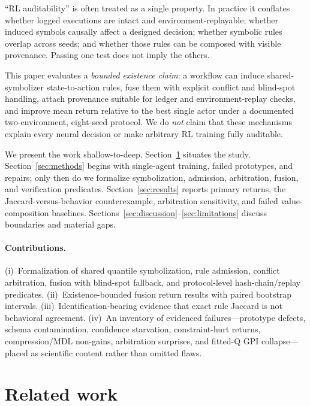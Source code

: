 \documentclass[11pt,a4paper]{article}
\begin{document}
``RL auditability'' is often treated as a single property.
In practice it conflates whether logged executions are intact and environment-replayable; whether induced symbols causally affect a designed decision; whether symbolic rules overlap across seeds; and whether those rules can be composed with visible provenance.
Passing one test does not imply the others.

This paper evaluates a \emph{bounded existence claim}: a workflow can induce shared-symbolizer state-to-action rules, fuse them with explicit conflict and blind-spot handling, attach provenance suitable for ledger and environment-replay checks, and improve mean return relative to the best single actor under a documented two-environment, eight-seed protocol.
We do \emph{not} claim that these mechanisms explain every neural decision or make arbitrary RL training fully auditable.

We present the work shallow-to-deep.
Section~\ref{sec:related} situates the study.
Section~\ref{sec:methods} begins with single-agent training, failed prototypes, and repairs; only then do we formalize symbolization, admission, arbitration, fusion, and verification predicates.
Section~\ref{sec:results} reports primary returns, the Jaccard-versus-behavior counterexample, arbitration sensitivity, and failed value-composition baselines.
Sections~\ref{sec:discussion}--\ref{sec:limitations} discuss boundaries and material gaps.

\paragraph{Contributions.}
(i)~Formalization of shared quantile symbolization, rule admission, conflict arbitration, fusion with blind-spot fallback, and protocol-level hash-chain/replay predicates.
(ii)~Existence-bounded fusion return results with paired bootstrap intervals.
(iii)~Identification-bearing evidence that exact rule Jaccard is not behavioral agreement.
(iv)~An inventory of evidenced failures---prototype defects, schema contamination, confidence starvation, constraint-hurt returns, compression/MDL non-gains, arbitration surprises, and fitted-Q GPI collapse---placed as scientific content rather than omitted flaws.

\section{Related work}
\label{sec:related}
\end{document}
